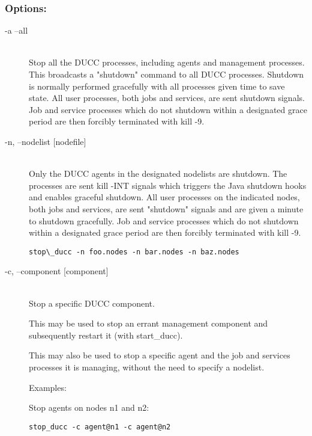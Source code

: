       \subsubsection{Options:}
        \begin{description}

          \item[-a --all] \hfill \\
            Stop all the DUCC processes, including agents and management processes. This 
            broadcasts a "shutdown" command to all DUCC processes. Shutdown is normally 
            performed gracefully with all processes given time to save state. 
            All user processes, both jobs and services, are sent shutdown signals. Job and service 
            processes which do not shutdown within a designated grace period are then forcibly 
            terminated with kill -9. 
            
          \item[-n, --nodelist {[nodefile]}] \hfill \\
            Only the DUCC agents in the designated nodelists are shutdown. The processes are sent 
            kill -INT signals which triggers the Java shutdown hooks and enables graceful shutdown. 
            All user processes on the indicated nodes, both jobs and services, are sent "shutdown" 
            signals and are given a minute to shutdown gracefully. Job and service processes which do 
            not shutdown within a designated grace period are then forcibly terminated with kill -9. 
            
\begin{verbatim}
stop\_ducc -n foo.nodes -n bar.nodes -n baz.nodes 
\end{verbatim}

          \item[-c, --component {[component]}] \hfill \\
            Stop a specific DUCC component. 

            This may be used to stop an errant management component and subsequently restart it 
            (with start\_ducc). 
            
            This may also be used to stop a specific agent and the job and services processes it is
            managing, without the need to specify a nodelist.  
            
            Examples: 

            Stop agents on nodes n1 and n2:
\begin{verbatim}
stop_ducc -c agent@n1 -c agent@n2 
\end{verbatim}
            

\end{description}
